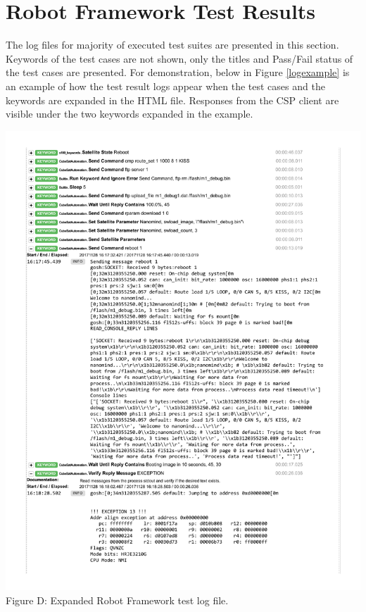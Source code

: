 \documentclass[english,12pt,a4paper,pdftex,elec,utf8]{aaltothesis}
\begin{document}
\section{Robot Framework Test Results\label{LiiteC}}
The log files for majority of executed test suites are presented in this section.
Keywords of the test cases are not shown, only the titles and Pass/Fail status of the test cases are presented. For demonstration, below in Figure \ref{logexample} is an example of how the test result logs appear when the test cases and the keywords are expanded in the HTML file. Responses from the CSP client are visible under the two keywords expanded in the example.\par
\begin{center}
\includegraphics[scale=0.63]{result_pdf/example.pdf}\\
Figure D: Expanded Robot Framework test log file.
\label{logexample}
\end{center}
\end{document}
